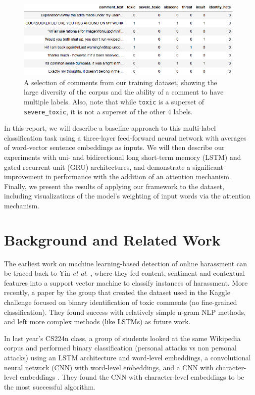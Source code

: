\documentclass{article} %
\begin{document}
\begin{figure}[ht]
\centering
\includegraphics[width=5in]{example_comments.png}
\caption{A selection of comments from our training dataset, showing the large diversity of the corpus and the ability of a comment to have multiple labels. Also, note that while  \texttt{toxic} is a superset of \texttt{severe\_toxic}, it is not a superset of the other 4 labels.}
\label{fig:example_comments}
\end{figure}

In this report, we will describe a baseline approach to this multi-label classification task using a three-layer feed-forward neural network with averages of word-vector sentence embeddings as inputs. We will then describe our experiments with uni- and bidirectional long short-term memory (LSTM) and gated recurrent unit (GRU) architectures, and demonstrate a significant improvement in performance with the addition of an attention mechanism. Finally, we present the results of applying our framework to the dataset, including visualizations of the model's weighting of input words via the attention mechanism.

\section{Background and Related Work}

The earliest work on machine learning-based detection of online harassment can be traced back to Yin \textit{et al.} \cite{yin2009}, where they fed content, sentiment and contextual features into a support vector machine to classify instances of harassment. More recently, a paper by the group that created the dataset used in the Kaggle challenge \cite{prevwork} focused on binary identification of toxic comments (no fine-grained classification). They found success with relatively simple n-gram NLP methods, and left more complex methods (like LSTMs) as future work. 

In last year's CS224n class, a group of students looked at the same Wikipedia corpus and performed binary classification (personal attacks vs non personal attacks) using an LSTM architecture and word-level embeddings, a convolutional neural network (CNN) with word-level embeddings, and a CNN with character-level embeddings \cite{lastyear}. They found the CNN with character-level embeddings to be the most successful algorithm. 
\end{document}
